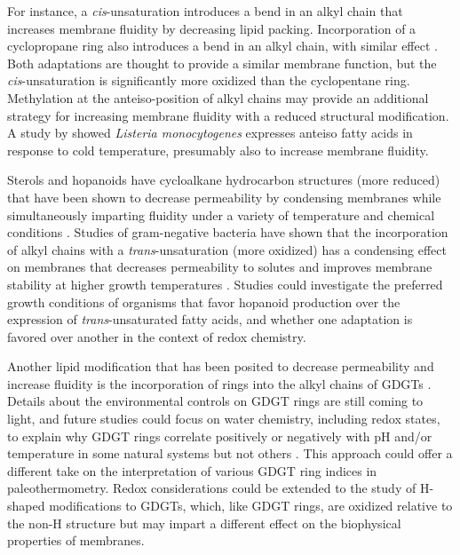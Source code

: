 For instance, a \textit{cis}-unsaturation introduces a bend in an alkyl chain that increases membrane fluidity by decreasing lipid packing. Incorporation of a cyclopropane ring also introduces a bend in an alkyl chain, with similar effect \citep{zhang2008membrane}. Both adaptations are thought to provide a similar membrane function, but the \textit{cis}-unsaturation is significantly more oxidized than the cyclopentane ring. Methylation at the anteiso-position of alkyl chains may provide an additional strategy for increasing membrane fluidity with a reduced structural modification. A study by \citep{zhu2005precursor} showed \textit{Listeria monocytogenes} expresses anteiso fatty acids in response to cold temperature, presumably also to increase membrane fluidity.

Sterols and hopanoids have cycloalkane hydrocarbon structures (more reduced) that have been shown to decrease permeability by condensing membranes while simultaneously imparting fluidity under a variety of temperature and chemical conditions \citep{belin2018hopanoid}. Studies of gram-negative bacteria have shown that the incorporation of alkyl chains with a \textit{trans}-unsaturation (more oxidized) has a condensing effect on membranes that decreases permeability to solutes \citep{halverson2000differential} and improves membrane stability at higher growth temperatures \citep{heipieper1996effect}. Studies could investigate the preferred growth conditions of organisms that favor hopanoid production over the expression of \textit{trans}-unsaturated fatty acids, and whether one adaptation is favored over another in the context of redox chemistry.

Another lipid modification that has been posited to decrease permeability and increase fluidity is the incorporation of rings into the alkyl chains of GDGTs \citep{sollich2017heat}. Details about the environmental controls on GDGT rings are still coming to light, and future studies could focus on water chemistry, including redox states, to explain why GDGT rings correlate positively or negatively with pH and/or temperature in some natural systems but not others \citep{jia2014differential, boyd2013role}. This approach could offer a different take on the interpretation of various GDGT ring indices in paleothermometry. Redox considerations could be extended to the study of H-shaped modifications to GDGTs, which, like GDGT rings, are oxidized relative to the non-H structure but may impart a different effect on the biophysical properties of membranes.

